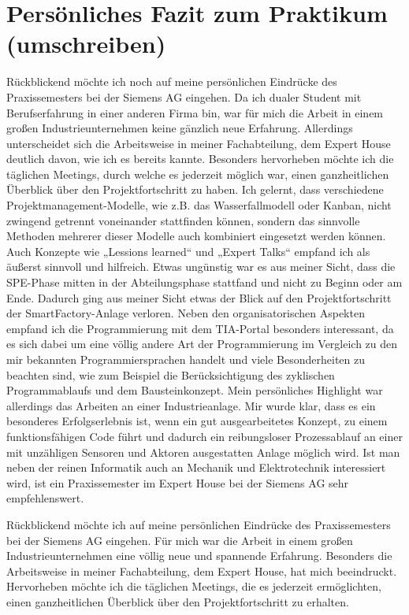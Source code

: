 \section{Persönliches Fazit zum Praktikum (umschreiben)}

Rückblickend möchte ich noch auf meine persönlichen Eindrücke des
Praxissemesters bei der Siemens AG eingehen.
Da ich dualer Student mit Berufserfahrung in einer anderen Firma bin, war für
mich die Arbeit in einem großen Industrieunternehmen keine gänzlich neue
Erfahrung. Allerdings unterscheidet sich die Arbeitsweise in meiner Fachabteilung,
dem Expert House deutlich davon, wie ich es bereits kannte. Besonders
hervorheben möchte ich die täglichen Meetings, durch welche es jederzeit möglich
war, einen ganzheitlichen Überblick über den Projektfortschritt zu haben. Ich
gelernt, dass verschiedene Projektmanagement-Modelle, wie z.B. das
Wasserfallmodell oder Kanban, nicht zwingend getrennt voneinander stattfinden
können, sondern das sinnvolle Methoden mehrerer dieser Modelle auch
kombiniert eingesetzt werden können. Auch Konzepte wie „Lessions learned“ und
„Expert Talks“ empfand ich als äußerst sinnvoll und hilfreich.
Etwas ungünstig war es aus meiner Sicht, dass die SPE-Phase mitten in der
Abteilungsphase stattfand und nicht zu Beginn oder am Ende. Dadurch ging aus
meiner Sicht etwas der Blick auf den Projektfortschritt der SmartFactory-Anlage
verloren. Neben den organisatorischen Aspekten empfand ich die
Programmierung mit dem TIA-Portal besonders interessant, da es sich dabei um
eine völlig andere Art der Programmierung im Vergleich zu den mir bekannten
Programmiersprachen handelt und viele Besonderheiten zu beachten sind, wie
zum Beispiel die Berücksichtigung des zyklischen Programmablaufs und dem
Bausteinkonzept. Mein persönliches Highlight war allerdings das Arbeiten an einer
Industrieanlage. Mir wurde klar, dass es ein besonderes Erfolgserlebnis ist, wenn
ein gut ausgearbeitetes Konzept, zu einem funktionsfähigen Code führt und
dadurch ein reibungsloser Prozessablauf an einer mit unzähligen Sensoren und
Aktoren ausgestatten Anlage möglich wird. Ist man neben der reinen Informatik
auch an Mechanik und Elektrotechnik interessiert wird, ist ein Praxissemester im
Expert House bei der Siemens AG sehr empfehlenswert.

Rückblickend möchte ich auf meine persönlichen Eindrücke des Praxissemesters bei der Siemens AG eingehen. Für mich war die Arbeit in einem großen 
Industrieunternehmen eine völlig neue und spannende Erfahrung. Besonders die Arbeitsweise in meiner Fachabteilung, dem Expert House, hat mich beeindruckt. 
Hervorheben möchte ich die täglichen Meetings, die es jederzeit ermöglichten, einen ganzheitlichen Überblick über den Projektfortschritt zu erhalten.

